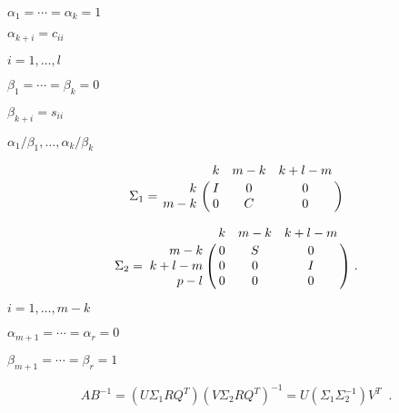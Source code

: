 {\newpage\clearpage
{}%
$\alpha_1 = \cdots = \alpha_k = 1$%
\lthtmlinlinemathZ
\lthtmlcheckvsize\clearpage}

{\newpage\clearpage
{}%
$\alpha_{k+i} = c_{ii}$%
\lthtmlinlinemathZ
\lthtmlcheckvsize\clearpage}

{\newpage\clearpage
{}%
$i=1, \ldots , l$%
\lthtmlinlinemathZ
\lthtmlcheckvsize\clearpage}

{\newpage\clearpage
{}%
$\beta_1 = \cdots = \beta_k = 0$%
\lthtmlinlinemathZ
\lthtmlcheckvsize\clearpage}

{\newpage\clearpage
{}%
$\beta_{k+i} = s_{ii}$%
\lthtmlinlinemathZ
\lthtmlcheckvsize\clearpage}

{\newpage\clearpage
{}%
$\alpha_1 / \beta_1 , \ldots , \alpha_k / \beta_k$%
\lthtmlinlinemathZ
\lthtmlcheckvsize\clearpage}

{\newpage\clearpage
{}%
\begin{displaymath}
\Sigma_1 = \bordermatrix{ & k & m-k & k+l-m \cr
                 \hfill k & I &  0  &   0   \cr
                      m-k & 0 &  C  &   0   }
\end{displaymath}%
\lthtmldisplayZ
\lthtmlcheckvsize\clearpage}

{\newpage\clearpage
{}%
\begin{displaymath}
\Sigma_2 = \bordermatrix{ & k & m-k & k+l-m \cr
               \hfill m-k & 0 &  S  &   0   \cr
                    k+l-m & 0 &  0  &   I   \cr
               \hfill p-l & 0 &  0  &   0   } \; .
\end{displaymath}%
\lthtmldisplayZ
\lthtmlcheckvsize\clearpage}

{\newpage\clearpage
{}%
$i=1, \ldots , m-k$%
\lthtmlinlinemathZ
\lthtmlcheckvsize\clearpage}

{\newpage\clearpage
{}%
$\alpha_{m+1} = \cdots = \alpha_r = 0$%
\lthtmlinlinemathZ
\lthtmlcheckvsize\clearpage}

{\newpage\clearpage
{}%
$\beta_{m+1} = \cdots = \beta_r = 1$%
\lthtmlinlinemathZ
\lthtmlcheckvsize\clearpage}

{\newpage\clearpage
{}%
\begin{displaymath}
AB^{-1} = (U \Sigma_1 R Q^T)(V \Sigma_2 R Q^T)^{-1} =
U ( \Sigma_1 \Sigma_2^{-1} ) V^T \; \; .
\end{displaymath}%
\lthtmldisplayZ
\lthtmlcheckvsize\clearpage}

